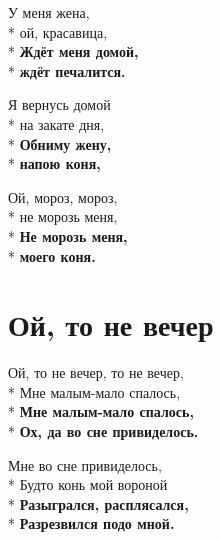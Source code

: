 \medskip

\begin{minipage}{\linewidth}
У меня жена,\\*
ой, красавица,\\*
\textbf{Ждёт меня домой,}\\*
\textbf{ждёт печалится.}\\
\end{minipage}\par\medskip\nobreak

\medskip

\begin{minipage}{\linewidth}
Я вернусь домой\\*
на закате дня,\\*
\textbf{Обниму жену,}\\*
\textbf{напою коня,}\\
\end{minipage}\par\medskip\nobreak

\medskip

\begin{minipage}{\linewidth}
Ой, мороз, мороз,\\*
не морозь меня,\\*
\textbf{Не морозь меня,}\\*
\textbf{моего коня.}\\
\end{minipage}

\vspace{\fill}\newpage

\section{Ой, то не вечер}
\label{song:Ой,_то_не_вечер}

\medskip

\begin{minipage}{\linewidth}
Ой, то не вечер, то не вечер,\\*
Мне малым-мало спалось,\\*
\textbf{Мне малым-мало спалось,}\\*
\textbf{Ох, да во сне привиделось.}\\
\end{minipage}\par\medskip\nobreak

\medskip

\begin{minipage}{\linewidth}
Мне во сне привиделось,\\*
Будто конь мой вороной\\*
\textbf{Разыгрался, расплясался,}\\*
\textbf{Разрезвился подо мной.}\\
\end{minipage}\par\medskip\nobreak

